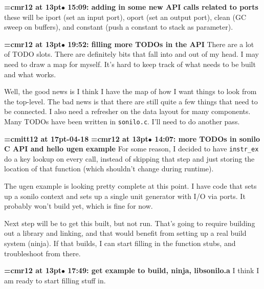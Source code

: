{\smallskip\noindent\bf\font\titlefont=cmr12 at 13pt\titlefont $\bullet$ 15:09: adding in some new API calls related to ports}\smallskip
these will be iport (set an input port), oport (set an output port), clean (GC sweep on buffers), and constant (push a constant to stack as parameter).
\par

{\smallskip\noindent\bf\font\titlefont=cmr12 at 13pt\titlefont $\bullet$ 19:52: filling more TODOs in the API}\smallskip
There are a lot of TODO slots. There are definitely bits that fall into and out of my head. I may need to draw a map for myself. It's hard to keep track of what needs to be built and what works.
\par

Well, the good news is I think I have the map of how I want things to look from the top-level. The bad news is that there are still quite a few things that need to be connected. I also need a refresher on the data layout for many components. Many TODOs have been written in {\tt sonilo.c}. I'll need to do another pass.
\par

{\medskip\noindent\bf\font\titlefont=cmitt12 at 17pt-04-18}\medskip
{\smallskip\noindent\bf\font\titlefont=cmr12 at 13pt\titlefont $\bullet$ 14:07: more TODOs in sonilo C API and hello ugen example}\smallskip
For some reason, I decided to have {\tt instr\_ex} do a key lookup on every call, instead of skipping that step and just storing the location of that function (which shouldn't change during runtime).
\par

The ugen example is looking pretty complete at this point. I have code that sets up a sonilo context and sets up a single unit generator with I/O via ports. It probably won't build yet, which is fine for now.
\par

Next step will be to get this built, but not run. That's going to require building out a library and linking, and that would benefit from setting up a real build system (ninja). If that builds, I can start filling in the function stubs, and troubleshoot from there.
\par

{\smallskip\noindent\bf\font\titlefont=cmr12 at 13pt\titlefont $\bullet$ 17:49: get example to build, ninja, libsonilo.a}\smallskip
I think I am ready to start filling stuff in.
\par

